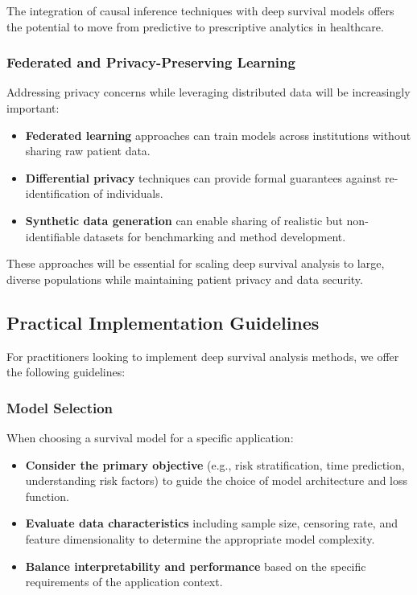 The integration of causal inference techniques with deep survival models offers the potential to move from predictive to prescriptive analytics in healthcare.

\subsubsection{Federated and Privacy-Preserving Learning}

Addressing privacy concerns while leveraging distributed data will be increasingly important:

\begin{itemize}
    \item \textbf{Federated learning} approaches can train models across institutions without sharing raw patient data.
    
    \item \textbf{Differential privacy} techniques can provide formal guarantees against re-identification of individuals.
    
    \item \textbf{Synthetic data generation} can enable sharing of realistic but non-identifiable datasets for benchmarking and method development.
\end{itemize}

These approaches will be essential for scaling deep survival analysis to large, diverse populations while maintaining patient privacy and data security.

\subsection{Practical Implementation Guidelines}

For practitioners looking to implement deep survival analysis methods, we offer the following guidelines:

\subsubsection{Model Selection}

When choosing a survival model for a specific application:

\begin{itemize}
    \item \textbf{Consider the primary objective} (e.g., risk stratification, time prediction, understanding risk factors) to guide the choice of model architecture and loss function.
    
    \item \textbf{Evaluate data characteristics} including sample size, censoring rate, and feature dimensionality to determine the appropriate model complexity.
    
    \item \textbf{Balance interpretability and performance} based on the specific requirements of the application context.
\end{itemize}

